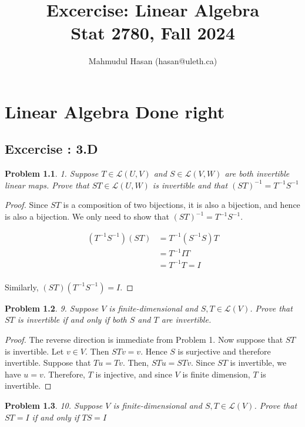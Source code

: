 \documentclass[12pt]{book}
\title{Excercise: Linear Algebra\\
\large{Stat 2780, Fall 2024}}
\author{Mahmudul Hasan (hasan@uleth.ca)\\
}
\newtheorem*{problem*}{Problem}
\newcommand{\LL}{\mathcal{L}}
\begin{document}
% 

\chapter{Linear Algebra Done right}

\section{Excercise : 3.D}

\begin{problem*}
  1. Suppose $T \in \LL(U,V)$ and $ S \in \LL(V,W)$ are both invertible
  linear maps. Prove that $ST \in \LL(U,W)$ is invertible and that $(ST)^{-1} = T^{-1}S^{-1}$
\end{problem*}

\begin{proof}
  Since $ST$ is a composition of two bijections, it is also a bijection, and hence is also a bijection. We only need to show that $(ST)^{-1} = T^{-1}S^{-1}$.

  \begin{align*}
    (T^{-1} S^{-1}) (S T) & = T^{-1} (S^{-1} S) T\\
    & = T^{-1} I T\\
    & = T^{-1}T = I \\
  \end{align*}

  Similarly, $(S T) (T^{-1} S^{-1}) = I$.
\end{proof}

\begin{problem*}9. Suppose $V$ is finite-dimensional and $S,T \in \LL(V)$. Prove that $ST$ is invertible if and only if both $S$ and $T$ are invertible.\end{problem*}

\begin{proof}
  The reverse direction is immediate from Problem 1. Now suppose that $ST$ is invertible. Let $v \in V$. Then $STv = v$. Hence $S$ is surjective and therefore invertible. Suppose that $Tu = Tv$. Then, $ST u = ST v$. Since $ST$ is invertible, we have $u = v$. Therefore, $T$ is injective, and since $V$ is finite dimension, $T$ is invertible. 
\end{proof}

\begin{problem*}10. Suppose $V$ is finite-dimensional and $S, T \in \LL(V)$. Prove that $ST = I$ if and only if $TS = I$\end{problem*}
\end{document}
